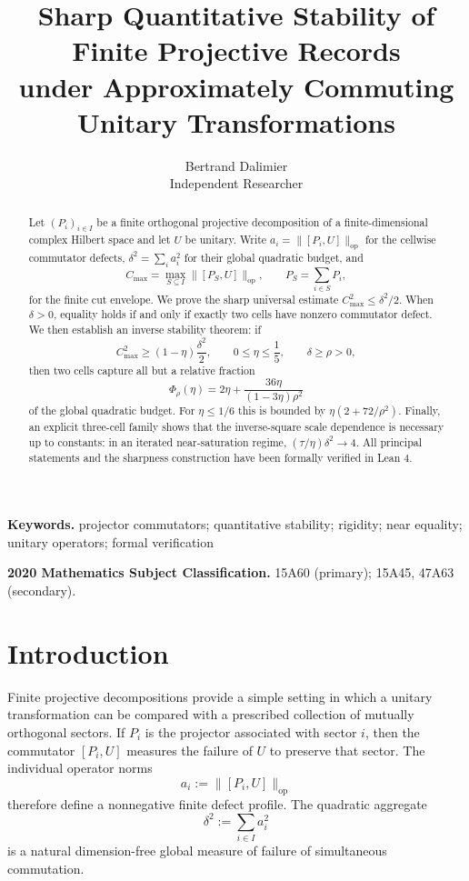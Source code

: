 \documentclass[11pt]{article}
\title{Sharp Quantitative Stability of Finite Projective Records\\
under Approximately Commuting Unitary Transformations}
\author{Bertrand Dalimier\\
Independent Researcher}
\date{}
\newcommand{\op}{\mathrm{op}}
\newcommand{\cmax}{C_{\max}}
\newcommand{\dd}{\delta}
\newcommand{\etaq}{\eta}
\newcommand{\tauq}{\tau}
\newcommand{\PhiRho}{\Phi_{\rho}}
\begin{document}
\maketitle

\begin{abstract}
Let $(P_i)_{i\in I}$ be a finite orthogonal projective decomposition of a
finite-dimensional complex Hilbert space and let $U$ be unitary.  Write
$a_i=\|[P_i,U]\|_{\op}$ for the cellwise commutator defects,
$\dd^2=\sum_i a_i^2$ for their global quadratic budget, and
\[
  \cmax=\max_{S\subseteq I}\|[P_S,U]\|_{\op},
  \qquad P_S=\sum_{i\in S}P_i ,
\]
for the finite cut envelope.  We prove the sharp universal estimate
$\cmax^2\le \dd^2/2$.  When $\dd>0$, equality holds if and only if exactly two
cells have nonzero commutator defect.  We then establish an inverse stability
theorem: if
\[
  \cmax^2\ge (1-\etaq)\frac{\dd^2}{2},\qquad
  0\le\etaq\le\frac15,\qquad \dd\ge\rho>0,
\]
then two cells capture all but a relative fraction
\[
  \PhiRho(\etaq)
  =2\etaq+\frac{36\etaq}{(1-3\etaq)\rho^2}
\]
of the global quadratic budget.  For $\etaq\le1/6$ this is bounded by
$\etaq(2+72/\rho^2)$.  Finally, an explicit three-cell family shows that the
inverse-square scale dependence is necessary up to constants: in an iterated
near-saturation regime, $(\tauq/\etaq)\dd^2\to4$.  All principal statements
and the sharpness construction have been formally verified in Lean 4.
\end{abstract}

\noindent\textbf{Keywords.}
projector commutators; quantitative stability; rigidity; near equality;
unitary operators; formal verification

\noindent\textbf{2020 Mathematics Subject Classification.}
15A60 (primary); 15A45, 47A63 (secondary).

\section{Introduction}

Finite projective decompositions provide a simple setting in which a unitary
transformation can be compared with a prescribed collection of mutually
orthogonal sectors.  If $P_i$ is the projector associated with sector $i$,
then the commutator $[P_i,U]$ measures the failure of $U$ to preserve that
sector.  The individual operator norms
\[
  a_i:=\|[P_i,U]\|_{\op}
\]
therefore define a nonnegative finite defect profile.  The quadratic aggregate
\[
  \dd^2:=\sum_{i\in I} a_i^2
\]
is a natural dimension-free global measure of failure of simultaneous
commutation.
\end{document}

